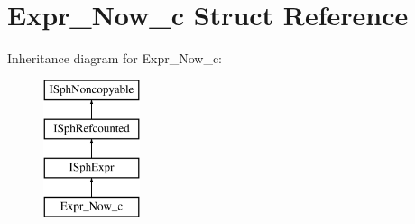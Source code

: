 \hypertarget{structExpr__Now__c}{\section{Expr\-\_\-\-Now\-\_\-c Struct Reference}
\label{structExpr__Now__c}
}
Inheritance diagram for Expr\-\_\-\-Now\-\_\-c\-:\begin{figure}[H]
\begin{center}
\leavevmode
\includegraphics[height=4.000000cm]{structExpr__Now__c}
\end{center}
\end{figure}

